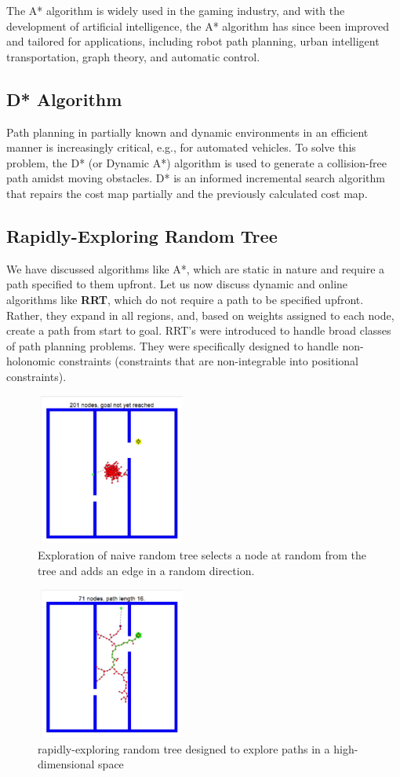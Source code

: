 \documentclass[11pt]{article}
\begin{document}
The A* algorithm is widely used in the gaming industry, and with the development of artificial intelligence, the A* algorithm has since been improved and tailored for
applications, including robot path planning, urban intelligent transportation, graph theory,
and automatic control.

\subsection{D* Algorithm}
Path planning in partially known and dynamic environments in an efficient manner
is increasingly critical, e.g., for automated vehicles. To solve this problem, the D* (or
Dynamic A*) algorithm is used to generate a collision-free path amidst moving obstacles.
D* is an informed incremental search algorithm that repairs the cost map partially and the
previously calculated cost map.

\subsection{Rapidly-Exploring Random Tree}
We have discussed algorithms like A*, which are static in nature and require a
path specified to them upfront. Let us now discuss dynamic and online algorithms like
\textbf{RRT}, which do not require a path to be specified upfront. Rather, they expand in all
regions, and, based on weights assigned to each node, create a path from start to goal. RRT’s
were introduced to handle broad classes of path planning problems. They were specifically
designed to handle non-holonomic constraints (constraints that are non-integrable into
positional constraints).
\begin{figure}[h]
\includegraphics[width = 5cm,height = 5cm]{naive-random-tree}
\caption{Exploration of naive random tree selects a node at random from the tree and adds an edge
in a random direction.}
\end{figure}
\begin{figure}[h!]
\includegraphics[width = 5cm,height = 5cm]{rapidly-exploring-random-tree}
\caption{rapidly-exploring random tree designed to explore paths in a high-dimensional space}
\end{figure}
\end{document}
